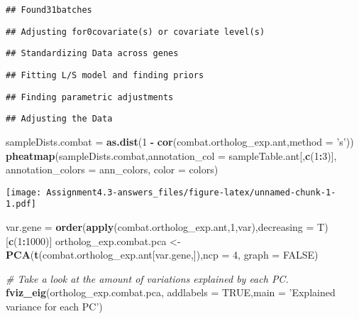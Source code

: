 \documentclass[]{article}
\newenvironment{Shaded}{\begin{snugshade}}{\end{snugshade}}
\newcommand{\KeywordTok}[1]{\textcolor[rgb]{0.13,0.29,0.53}{\textbf{#1}}}
\newcommand{\DataTypeTok}[1]{\textcolor[rgb]{0.13,0.29,0.53}{#1}}
\newcommand{\DecValTok}[1]{\textcolor[rgb]{0.00,0.00,0.81}{#1}}
\newcommand{\StringTok}[1]{\textcolor[rgb]{0.31,0.60,0.02}{#1}}
\newcommand{\CommentTok}[1]{\textcolor[rgb]{0.56,0.35,0.01}{\textit{#1}}}
\newcommand{\OtherTok}[1]{\textcolor[rgb]{0.56,0.35,0.01}{#1}}
\newcommand{\OperatorTok}[1]{\textcolor[rgb]{0.81,0.36,0.00}{\textbf{#1}}}
\newcommand{\NormalTok}[1]{#1}
\begin{document}
\begin{verbatim}
## Found31batches
\end{verbatim}

\begin{verbatim}
## Adjusting for0covariate(s) or covariate level(s)
\end{verbatim}

\begin{verbatim}
## Standardizing Data across genes
\end{verbatim}

\begin{verbatim}
## Fitting L/S model and finding priors
\end{verbatim}

\begin{verbatim}
## Finding parametric adjustments
\end{verbatim}

\begin{verbatim}
## Adjusting the Data
\end{verbatim}

\begin{Shaded}
\begin{Highlighting}[]
\NormalTok{sampleDists.combat =}\StringTok{ }\KeywordTok{as.dist}\NormalTok{(}\DecValTok{1} \OperatorTok{-}\StringTok{ }\KeywordTok{cor}\NormalTok{(combat.ortholog_exp.ant,}\DataTypeTok{method =} \StringTok{'s'}\NormalTok{))}
\KeywordTok{pheatmap}\NormalTok{(sampleDists.combat,}\DataTypeTok{annotation_col =}\NormalTok{ sampleTable.ant[,}\KeywordTok{c}\NormalTok{(}\DecValTok{1}\OperatorTok{:}\DecValTok{3}\NormalTok{)], }
         \DataTypeTok{annotation_colors =}\NormalTok{ ann_colors,}
         \DataTypeTok{color =}\NormalTok{ colors) }
\end{Highlighting}
\end{Shaded}

\texttt{[image: Assignment4.3-answers\_files/figure-latex/unnamed-chunk-1-1.pdf]}

\begin{Shaded}
\begin{Highlighting}[]
\NormalTok{var.gene =}\StringTok{ }\KeywordTok{order}\NormalTok{(}\KeywordTok{apply}\NormalTok{(combat.ortholog_exp.ant,}\DecValTok{1}\NormalTok{,var),}\DataTypeTok{decreasing =}\NormalTok{ T)[}\KeywordTok{c}\NormalTok{(}\DecValTok{1}\OperatorTok{:}\DecValTok{1000}\NormalTok{)]}
\NormalTok{ortholog_exp.combat.pca <-}\StringTok{ }\KeywordTok{PCA}\NormalTok{(}\KeywordTok{t}\NormalTok{(combat.ortholog_exp.ant[var.gene,]),}\DataTypeTok{ncp =} \DecValTok{4}\NormalTok{, }\DataTypeTok{graph =} \OtherTok{FALSE}\NormalTok{)}

\CommentTok{# Take a look at the amount of variations explained by each PC.}
\KeywordTok{fviz_eig}\NormalTok{(ortholog_exp.combat.pca, }\DataTypeTok{addlabels =} \OtherTok{TRUE}\NormalTok{,}\DataTypeTok{main =} \StringTok{'Explained variance for each PC'}\NormalTok{)}
\end{Highlighting}
\end{Shaded}
\end{document}
